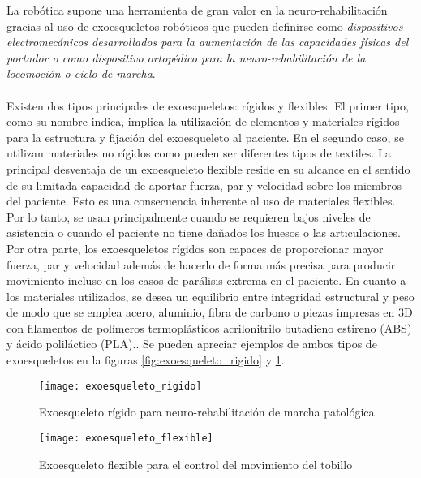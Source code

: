 La robótica supone una herramienta de gran valor en la neuro-rehabilitación gracias al uso de exoesqueletos robóticos que pueden definirse como \textit{dispositivos electromecánicos desarrollados para la aumentación de las capacidades físicas del portador o como dispositivo ortopédico para la neuro-rehabilitación de la locomoción o ciclo de marcha}\cite{exoesqueletos}. 
\\
\\
Existen dos tipos principales de exoesqueletos: rígidos y flexibles. El primer tipo, como su nombre indica, implica la utilización de elementos y materiales rígidos para la estructura y fijación del exoesqueleto al paciente. En el segundo caso, se utilizan materiales no rígidos como pueden ser diferentes tipos de textiles. La principal desventaja de un exoesqueleto flexible reside en su alcance en el sentido de su limitada capacidad de aportar fuerza, par y velocidad sobre los miembros del paciente. Esto es una consecuencia inherente al uso de materiales flexibles. Por lo tanto, se usan principalmente cuando se requieren bajos niveles de asistencia o cuando el paciente no tiene dañados los huesos o las articulaciones. Por otra parte, los exoesqueletos rígidos son capaces de proporcionar mayor fuerza, par y velocidad además de hacerlo de forma más precisa para producir movimiento incluso en los casos de parálisis extrema en el paciente. En cuanto a los materiales utilizados, se desea un equilibrio entre integridad estructural y peso de modo que se emplea acero, aluminio, fibra de carbono o piezas impresas en 3D con filamentos de polímeros termoplásticos acrilonitrilo butadieno estireno (ABS) y ácido poliláctico (PLA).\cite{estudio_exoesqueletos}\cite{comparacion_exoesqueletos}. Se pueden apreciar ejemplos de ambos tipos de exoesqueletos en la figuras \ref{fig:exoesqueleto_rigido} y \ref{fig:exoesqueleto_flexible}.\\

\begin{figure}[!htb]

  \texttt{[image: exoesqueleto\_rigido]}
  \caption{Exoesqueleto rígido para neuro-rehabilitación de marcha patológica\cite{exoesqueleto_rigido}}\label{fig:exoesqueleto_rigido}
\endminipage\hfill
{}%
  \texttt{[image: exoesqueleto\_flexible]}
  \caption{Exoesqueleto flexible para el control del movimiento del tobillo\cite{exoesqueleto_flexible}}\label{fig:exoesqueleto_flexible}
\endminipage

\end{figure}

